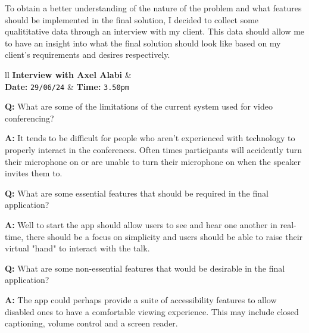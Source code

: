 
To obtain a better understanding of the nature of the problem
and what features should be implemented in the final solution,
I decided to collect some qualititative data through an 
interview with my client. This data should allow me to have an
insight into what the final solution should look like based
on my client's requirements and desires respectively.

\begin{tcolorbox}[
  boxrule=0pt, frame empty, colback=lightestgray, arc=0pt
]
  \begin{tblr}{ll}
    \textbf{Interview with Axel Alabi} & {}\\
    \textbf{Date: } \texttt{29/06/24} &
    {\hspace{-1.5cm} \textbf{Time: } \texttt{3.50pm}}
  \end{tblr}

  \vspace{0.2cm}

  \textbf{Q:} What are some of the limitations of the current
  system used for video conferencing? \vspace{0.05cm}

  \textbf{A:} It tends to be difficult for people who aren't 
  experienced with technology to properly interact in the 
  conferences. Often times participants will accidently turn 
  their microphone on or are unable to turn their microphone
  on when the speaker invites them to. \vspace{0.25cm}

  \textbf{Q:} What are some essential features that should be
  required in the final application? \vspace{0.05cm}

  \textbf{A:} Well to start the app should allow users to see 
  and hear one another in real-time, there should be a focus on
  simplicity and users should be able to raise their virtual 
  "hand" to interact with the talk. \vspace{0.25cm}

  \textbf{Q:} What are some non-essential features that would
  be desirable in the final application? \vspace{0.05cm}

  \textbf{A:} The app could perhaps provide a suite of 
  accessibility features to allow disabled ones to have a 
  comfortable viewing experience. This may include closed
  captioning, volume control and a screen reader.
  \vspace{0.25cm}


\end{tcolorbox}
